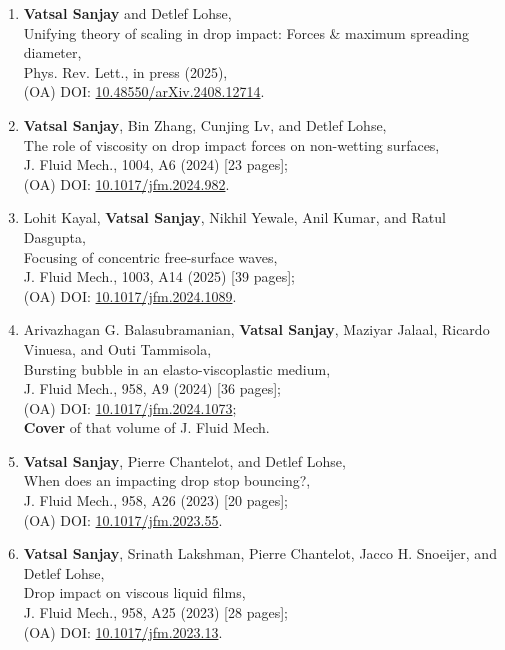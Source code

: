 \documentclass[10pt,a4paper,colorlinks,linkcolor=blue,urlcolor=blue,citecolor=blue]{moderncv}
\begin{document}
\begin{enumerate}[leftmargin=0.75cm]
	\item \textbf{Vatsal Sanjay} and Detlef Lohse,\\
	Unifying theory of scaling in drop impact: Forces \& maximum spreading diameter,\\
	Phys. Rev. Lett., in press (2025),\\
	(OA) DOI: \href{https://doi.org/10.48550/arXiv.2408.12714}{{10.48550/arXiv.2408.12714}}.

	\item \textbf{Vatsal Sanjay}, Bin Zhang, Cunjing Lv, and Detlef Lohse,\\
	The role of viscosity on drop impact forces on non-wetting surfaces,\\
	J. Fluid Mech., 1004, A6 (2024) [23 pages];\\
	(OA) DOI: \href{https://doi.org/10.1017/jfm.2024.982}{{10.1017/jfm.2024.982}}.

	\item Lohit Kayal, \textbf{Vatsal Sanjay}, Nikhil Yewale, Anil Kumar, and Ratul Dasgupta,\\
	Focusing of concentric free-surface waves,\\
	J. Fluid Mech., 1003, A14 (2025) [39 pages];\\
	(OA) DOI: \href{https://doi.org/10.1017/jfm.2024.1089}{{10.1017/jfm.2024.1089}}.

	\item Arivazhagan G. Balasubramanian, \textbf{Vatsal Sanjay}, Maziyar Jalaal, Ricardo Vinuesa, and Outi Tammisola,\\
	Bursting bubble in an elasto-viscoplastic medium,\\
	J. Fluid Mech., 958, A9 (2024) [36 pages];\\
	(OA) DOI: \href{https://doi.org/10.1017/jfm.2024.1073}{{10.1017/jfm.2024.1073}};\\
	\textbf{Cover} of that volume of J. Fluid Mech.

	\item \textbf{Vatsal Sanjay}, Pierre Chantelot, and Detlef Lohse,\\
	When does an impacting drop stop bouncing?,\\
	J. Fluid Mech., 958, A26 (2023) [20 pages];\\
	(OA) DOI: \href{https://doi.org/10.1017/jfm.2023.55}{{10.1017/jfm.2023.55}}.

	\item \textbf{Vatsal Sanjay}, Srinath Lakshman, Pierre Chantelot, Jacco H. Snoeijer, and Detlef Lohse,\\
	Drop impact on viscous liquid films,\\
	J. Fluid Mech., 958, A25 (2023) [28 pages];\\
	(OA) DOI: \href{https://doi.org/10.1017/jfm.2023.13}{{10.1017/jfm.2023.13}}.


\end{enumerate}
\end{document}
